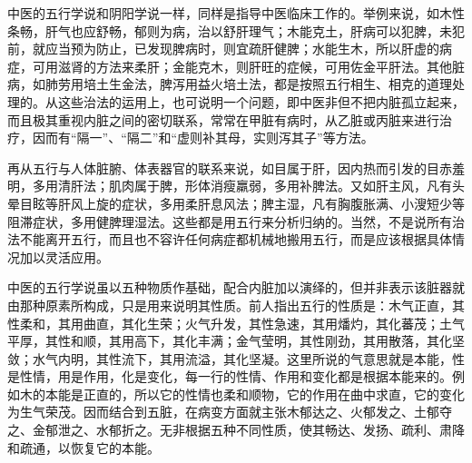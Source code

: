 \documentclass[a4paper,12pt,UTF8,twoside]{ctexbook}
\begin{document}
\begin{table}\centering
{}
\end{table}

中医的五行学说和阴阳学说一样，同样是指导中医临床工作的。举例来说，如木性条畅，肝气也应舒畅，郁则为病，治以舒肝理气；木能克土，肝病可以犯脾，未犯前，就应当预为防止，已发现脾病时，则宜疏肝健脾；水能生木，所以肝虚的病症，可用滋肾的方法来柔肝；金能克木，则肝旺的症候，可用佐金平肝法。其他脏病，如肺劳用培土生金法，脾泻用益火培土法，都是按照五行相生、相克的道理处理的。从这些治法的运用上，也可说明一个问题，即中医非但不把内脏孤立起来，而且极其重视内脏之间的密切联系，常常在甲脏有病时，从乙脏或丙脏来进行治疗，因而有“隔一”、“隔二”和“虚则补其母，实则泻其子”等方法。

再从五行与人体脏腑、体表器官的联系来说，如目属于肝，因内热而引发的目赤羞明，多用清肝法；肌肉属于脾，形体消瘦羸弱，多用补脾法。又如肝主风，凡有头晕目眩等肝风上旋的症状，多用柔肝息风法；脾主湿，凡有胸腹胀满、小溲短少等阻滞症状，多用健脾理湿法。这些都是用五行来分析归纳的。当然，不是说所有治法不能离开五行，而且也不容许任何病症都机械地搬用五行，而是应该根据具体情况加以灵活应用。

中医的五行学说虽以五种物质作基础，配合内脏加以演绎的，但并非表示该脏器就由那种原素所构成，只是用来说明其性质。前人指出五行的性质是：木气正直，其性柔和，其用曲直，其化生荣；火气升发，其性急速，其用燔灼，其化蕃茂；土气平厚，其性和顺，其用高下，其化丰满；金气莹明，其性刚劲，其用散落，其化坚敛；水气内明，其性流下，其用流溢，其化坚凝。这里所说的气意思就是本能，性是性情，用是作用，化是变化，每一行的性情、作用和变化都是根据本能来的。例如木的本能是正直的，所以它的性情也柔和顺物，它的作用在曲中求直，它的变化为生气荣茂。因而结合到五脏，在病变方面就主张木郁达之、火郁发之、土郁夺之、金郁泄之、水郁折之。无非根据五种不同性质，使其畅达、发扬、疏利、肃降和疏通，以恢复它的本能。
\end{document}
